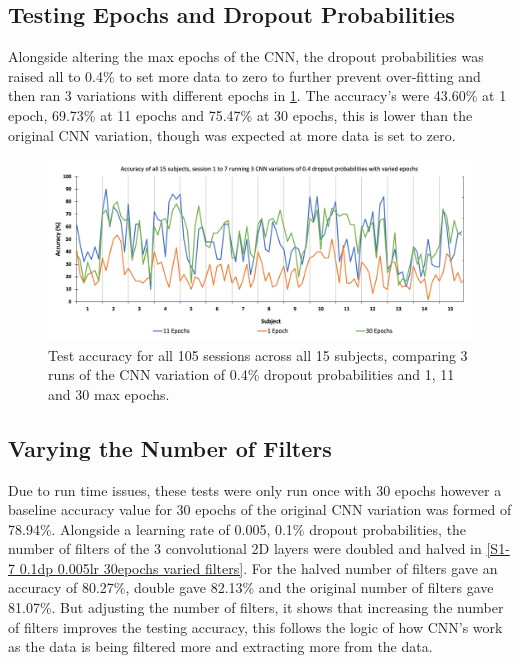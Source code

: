 \subsection{Testing Epochs and Dropout Probabilities}
\label{All Subjects, 1 to 7 Testing Epochs and Dropout Probabilities SubSection}

Alongside altering the max epochs of the CNN, the dropout probabilities was raised all to 0.4\% to set more data to zero to further prevent over-fitting and then ran 3 variations with different epochs in \cref{S1-7 0.4 Dropout Varied Epoch Acc}. The accuracy's were 43.60\% at 1 epoch, 69.73\% at 11 epochs and 75.47\% at 30 epochs, this is lower than the original CNN variation, though was expected at more data is set to zero.

\begin{figure}[H]
\centering
\includegraphics[scale=0.5]{Media/SBJ1-15_S1-7/SBJ1-15&S1-7_04_Dropout_Varied_Epochs_Accuracy.png}
\caption{Test accuracy for all 105 sessions across all 15 subjects, comparing 3 runs of the CNN variation of 0.4\% dropout probabilities and 1, 11 and 30 max epochs.}
\label{S1-7 0.4 Dropout Varied Epoch Acc}
\end{figure}

\subsection{Varying the Number of Filters}
\label{All Subjects, 1 to 7 Varying the Number of Filters SubSection}

Due to run time issues, these tests were only run once with 30 epochs however a baseline accuracy value for 30 epochs of the original CNN variation was formed of 78.94\%. Alongside a learning rate of 0.005, 0.1\% dropout probabilities, the number of filters of the 3 convolutional 2D layers were doubled and halved in \cref{S1-7 0.1dp 0.005lr 30epochs varied filters}. For the halved number of filters gave an accuracy of 80.27\%, double gave 82.13\% and the original number of filters gave 81.07\%. But adjusting the number of filters, it shows that increasing the number of filters improves the testing accuracy, this follows the logic of how CNN's work as the data is being filtered more and extracting more from the data.

